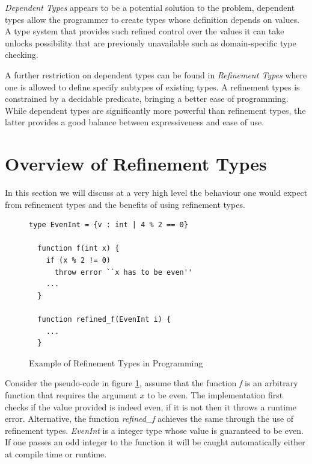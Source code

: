 \documentclass[a4paper,12pt]{report}
\begin{document}
\par
\textit{Dependent Types} \cite{depenTypeAtWork} appears to be a potential solution 
to the problem, dependent types allow the programmer to create types whose 
definition depends on values. A type system that provides such refined 
control over the values it can take unlocks possibility that are previously 
unavailable such as domain-specific type checking.

\par
A further restriction on dependent types can be found in \textit{Refinement 
Types} \cite{refinementTypes} where one is allowed to define specify subtypes 
of existing types. A refinement types is constrained by a decidable predicate, 
bringing a better ease of programming. While dependent types are significantly 
more powerful than refinement types, the latter provides a good balance between 
expressiveness and ease of use.

\section{Overview of Refinement Types}
In this section we will discuss at a very high level the behaviour one would 
expect from refinement types and the benefits of using refinement types. 

\begin{figure}[h] 
  \begin{lstlisting}[mathescape=true] 
  type EvenInt = {v : int | 4 % 2 == 0}
  
  function f(int x) {
    if (x % 2 != 0) 
      throw error ``x has to be even''
    ...
  }
  
  function refined_f(EvenInt i) {
    ...
  }
  \end{lstlisting}
  \caption{Example of Refinement Types in Programming}
  \label{code:refine}
\end{figure}

\par
Consider the pseudo-code in figure \ref{code:refine}, assume that the function 
\textit{f} is an arbitrary function that requires the argument $x$ to be even.
The implementation first checks if the value provided is indeed even, if it 
is not then it throws a runtime error. Alternative, the function \textit{refined\_f} 
achieves the same through the use of refinement types. \textit{EvenInt} is a 
integer type whose value is guaranteed to be even. If one passes an odd integer 
to the function it will be caught automatically either at compile time or 
runtime. 
\end{document}
